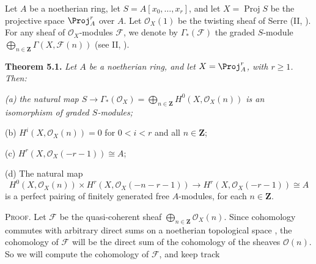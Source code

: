 {Let $A$ be a noetherian ring, let $S=A[x_0,\ldots,x_r]$, and let $X=\operatorname{Proj}S$ be the projective space $\Proj_A^r$ over $A$. Let $\mathcal O_X(1)$ be the twisting sheaf of Serre (II, ). For any sheaf of $\mathcal O_X$-modules $\mathcal F$, we denote by $\Gamma_*(\mathcal F)$ the graded $S$-module $\bigoplus_{n\in\mathbf Z}\Gamma(X,\mathcal F(n))$ (see II, ).

\smallskip
\noindent\hypertarget{result-III-5.1}{}\textbf{Theorem 5.1.} \emph{Let $A$ be a noetherian ring, and let $X=\Proj_A^r$, with $r\geq1$. Then:}
\par{\itshape\leftskip=12pt
\hypertarget{result-III-5.1a}{}(a) the natural map $S\to\Gamma_*(\mathcal O_X)=\bigoplus_{n\in\mathbf Z}H^0(X,\mathcal O_X(n))$ is an isomorphism of graded $S$-modules;

\hypertarget{result-III-5.1b}{}(b) $H^i(X,\mathcal O_X(n))=0$ for $0<i<r$ and all $n\in\mathbf Z$;

\hypertarget{result-III-5.1c}{}(c) $H^r(X,\mathcal O_X(-r-1))\cong A$;

\hypertarget{result-III-5.1d}{}(d) The natural map
\[
H^0(X,\mathcal O_X(n))\times H^r(X,\mathcal O_X(-n-r-1))\to H^r(X,\mathcal O_X(-r-1))\cong A
\]
is a perfect pairing of finitely generated free $A$-modules, for each $n\in\mathbf Z$.\par}

\smallskip
\noindent\textsc{Proof.} Let $\mathcal F$ be the quasi-coherent sheaf $\bigoplus_{n\in\mathbf Z}\mathcal O_X(n)$. Since cohomology commutes with arbitrary direct sums on a noetherian topological space , the cohomology of $\mathcal F$ will be the direct sum of the cohomology of the sheaves $\mathcal O(n)$. So we will compute the cohomology of $\mathcal F$, and keep track
}
